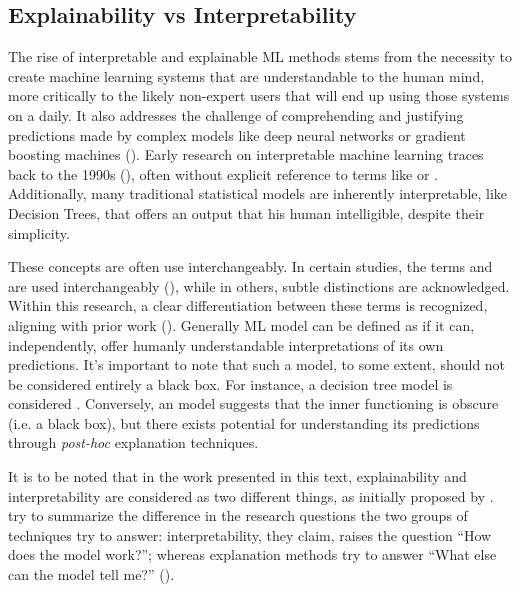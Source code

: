 \documentclass[binding=0.6cm]{sapthesis}
\newcommand{\mycite}[1]{(\cite{#1})}
\begin{document}
\subsection{Explainability vs Interpretability}
\label{sec:bg.xai.inter-vs-xai}
The rise of interpretable and explainable ML methods stems from the necessity to create machine learning systems that are understandable to the human mind, more critically to the likely non-expert users that will end up using those systems on a daily. It also addresses the challenge of comprehending and justifying predictions made by complex models like deep neural networks or gradient boosting machines \mycite{mason1999-nips-grad-desc,friedman2001-greedy-desc}. Early research on interpretable machine learning traces back to the 1990s \mycite{rudin2019-stop-epxlaining-black-box}, often without explicit reference to terms like  or . Additionally, many traditional statistical models are inherently interpretable, like Decision Trees, that offers an output that his human intelligible, despite their simplicity.  

These concepts are often use interchangeably. In certain studies, the terms  and  are used interchangeably \mycite{molnar2022}, while in others, subtle distinctions are acknowledged. Within this research, a clear differentiation between these terms is recognized, aligning with prior work \mycite{rudin2019-stop-epxlaining-black-box}. Generally ML model can be defined as  if it can, independently, offer humanly understandable interpretations of its own predictions. It's important to note that such a model, to some extent, should not be considered entirely a black box. For instance, a decision tree model is considered . Conversely, an  model suggests that the inner functioning is obscure (i.e. a black box), but there exists potential for understanding its predictions through \textit{post-hoc} explanation techniques.

It is to be noted that in the work presented in this text, explainability and interpretability are considered as two different things, as initially proposed by \cite{rudin2019-stop-epxlaining-black-box}. \cite{lipton2017-mythos} try to summarize the difference in the research questions the two groups of techniques try to answer: interpretability, they claim, raises the question “How does the model work?”; whereas explanation methods try to answer “What else can the model tell me?” \mycite{marcinkevičs2023-inter-vs-XAI}.
\end{document}
